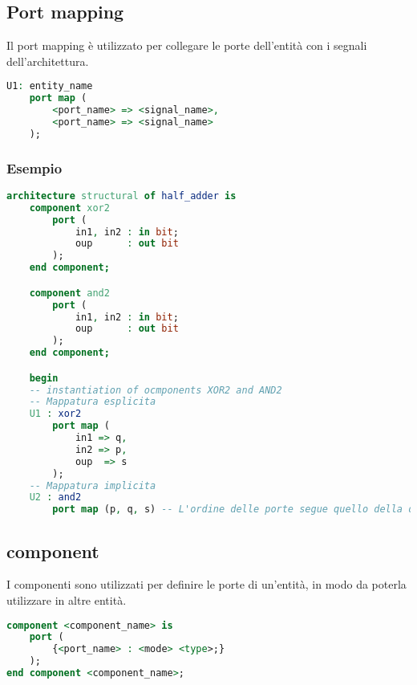         
        \subsection{Port mapping}
            Il port mapping è utilizzato per collegare le porte dell'entità con i segnali dell'architettura.
            \begin{lstlisting}[language=VHDL]
U1: entity_name
    port map (
        <port_name> => <signal_name>,
        <port_name> => <signal_name>
    );
            \end{lstlisting}

            \subsubsection{Esempio}
            \begin{lstlisting}[language=VHDL, numberstyle=\tiny\color{gray}\highlightlines{3,4,5,6,19,20,21,22,23,24}{yellow}, numberstyle=\tiny\color{gray}\highlightlines{10,11,12,13,26,27}{green}]
architecture structural of half_adder is
    component xor2
        port (
            in1, in2 : in bit;
            oup      : out bit
        );
    end component;

    component and2
        port (
            in1, in2 : in bit;
            oup      : out bit
        );
    end component;

    begin
    -- instantiation of ocmponents XOR2 and AND2
    -- Mappatura esplicita
    U1 : xor2
        port map (
            in1 => q,
            in2 => p,
            oup  => s
        );
    -- Mappatura implicita
    U2 : and2
        port map (p, q, s) -- L'ordine delle porte segue quello della dichiarazione del componente!
            \end{lstlisting}


    \subsection{component}
        I componenti sono utilizzati per definire le porte di un'entità, in modo da poterla utilizzare in altre entità.
        \begin{lstlisting}[language=VHDL]
component <component_name> is
    port (
        {<port_name> : <mode> <type>;}
    );
end component <component_name>;
        \end{lstlisting}


